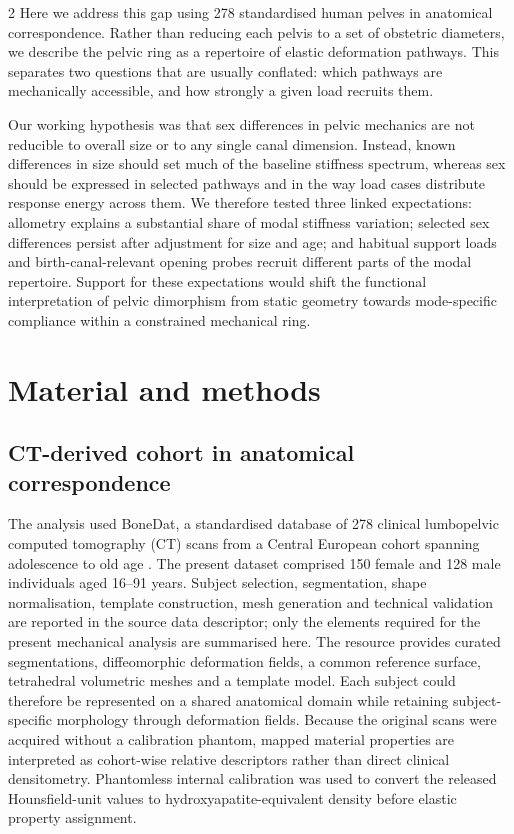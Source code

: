 \documentclass[openacc]{rsproca_new}
\begin{document}
\begin{multicols}{2}
Here we address this gap using 278 standardised human pelves in anatomical correspondence. Rather than reducing each pelvis to a set of obstetric diameters, we describe the pelvic ring as a repertoire of elastic deformation pathways. This separates two questions that are usually conflated: which pathways are mechanically accessible, and how strongly a given load recruits them.

Our working hypothesis was that sex differences in pelvic mechanics are not reducible to overall size or to any single canal dimension. Instead, known differences in size should set much of the baseline stiffness spectrum, whereas sex should be expressed in selected pathways and in the way load cases distribute response energy across them. We therefore tested three linked expectations: allometry explains a substantial share of modal stiffness variation; selected sex differences persist after adjustment for size and age; and habitual support loads and birth-canal-relevant opening probes recruit different parts of the modal repertoire. Support for these expectations would shift the functional interpretation of pelvic dimorphism from static geometry towards mode-specific compliance within a constrained mechanical ring.

\section{Material and methods}

\subsection{CT-derived cohort in anatomical correspondence}

The analysis used BoneDat, a standardised database of 278 clinical lumbopelvic computed tomography (CT) scans from a Central European cohort spanning adolescence to old age \cite{HenysKuchar2025}. The present dataset comprised 150 female and 128 male individuals aged 16--91 years. Subject selection, segmentation, shape normalisation, template construction, mesh generation and technical validation are reported in the source data descriptor; only the elements required for the present mechanical analysis are summarised here. The resource provides curated segmentations, diffeomorphic deformation fields, a common reference surface, tetrahedral volumetric meshes and a template model. Each subject could therefore be represented on a shared anatomical domain while retaining subject-specific morphology through deformation fields. Because the original scans were acquired without a calibration phantom, mapped material properties are interpreted as cohort-wise relative descriptors rather than direct clinical densitometry. Phantomless internal calibration was used to convert the released Hounsfield-unit values to hydroxyapatite-equivalent density before elastic property assignment.


\end{multicols}
\end{document}
